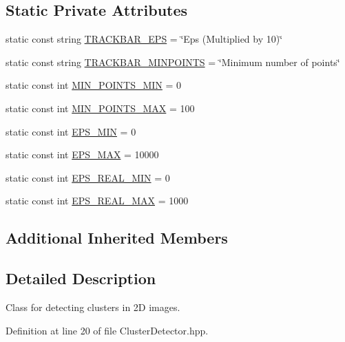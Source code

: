 \subsection*{Static Private Attributes}
\begin{DoxyCompactItemize}
\item 
static const string \hyperlink{classmultiscale_1_1analysis_1_1ClusterDetector_a656f64f88c73c25824e5a4416a742aaf}{T\-R\-A\-C\-K\-B\-A\-R\-\_\-\-E\-P\-S} = \char`\"{}Eps (Multiplied by 10)\char`\"{}
\item 
static const string \hyperlink{classmultiscale_1_1analysis_1_1ClusterDetector_a7f0fbbf3de8479b106893c4a8161bdaf}{T\-R\-A\-C\-K\-B\-A\-R\-\_\-\-M\-I\-N\-P\-O\-I\-N\-T\-S} = \char`\"{}Minimum number of points\char`\"{}
\item 
static const int \hyperlink{classmultiscale_1_1analysis_1_1ClusterDetector_aa0219df3977a845e46be090e6c3f90ad}{M\-I\-N\-\_\-\-P\-O\-I\-N\-T\-S\-\_\-\-M\-I\-N} = 0
\item 
static const int \hyperlink{classmultiscale_1_1analysis_1_1ClusterDetector_aabb41b5c6e865ee33cbb27568cae5a2d}{M\-I\-N\-\_\-\-P\-O\-I\-N\-T\-S\-\_\-\-M\-A\-X} = 100
\item 
static const int \hyperlink{classmultiscale_1_1analysis_1_1ClusterDetector_a6c3517e03d1fd2c6b4d6cd0d81eb8684}{E\-P\-S\-\_\-\-M\-I\-N} = 0
\item 
static const int \hyperlink{classmultiscale_1_1analysis_1_1ClusterDetector_a76d0b4ecd2793d478317cc1bc856e06f}{E\-P\-S\-\_\-\-M\-A\-X} = 10000
\item 
static const int \hyperlink{classmultiscale_1_1analysis_1_1ClusterDetector_ad9542bde7e3bf36d501a0b203dc61e09}{E\-P\-S\-\_\-\-R\-E\-A\-L\-\_\-\-M\-I\-N} = 0
\item 
static const int \hyperlink{classmultiscale_1_1analysis_1_1ClusterDetector_a3e60b9e068a8addf9dd27382c74e6d62}{E\-P\-S\-\_\-\-R\-E\-A\-L\-\_\-\-M\-A\-X} = 1000
\end{DoxyCompactItemize}
\subsection*{Additional Inherited Members}


\subsection{Detailed Description}
Class for detecting clusters in 2\-D images. 

Definition at line 20 of file Cluster\-Detector.\-hpp.



